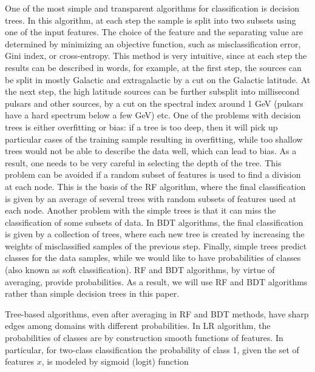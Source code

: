 One of the most simple and transparent algorithms for classification is decision trees.
In this algorithm, at each step the sample is split into two subsets using one of the input features.
The choice of the feature and the separating value are determined by minimizing an objective function, such as misclassification
error, Gini index, or cross-entropy.
This method is very intuitive, since at each step the results can be described in words, 
for example, at the first step, the sources can be split in mostly Galactic and extragalactic by a cut on the Galactic latitude.
At the next step, the high latitude sources can be further subsplit into millisecond pulsars and other sources, by a cut on the spectral index around 1 GeV (pulsars have a hard spectrum below a few GeV) etc.
One of the problems with decision trees is either overfitting or bias: if a tree is too deep, then it will pick up particular cases of the training sample resulting in overfitting, while too shallow trees would not be able to describe the data well, which can lead to bias. 
As a result, one needs to be very careful in selecting the depth of the tree.
This problem can be avoided if a random subset of features is used to find a division at each node. This is the basis of the RF algorithm,
where the final classification is given by an average of several trees with random subsets of features used at each node.
Another problem with the simple trees is that it can miss the classification of some subsets of data. In BDT algorithms, the final classification is given by a collection of trees, where each new tree is created by increasing the weights of misclassified samples of the previous step. 
Finally, simple trees predict classes for the data samples, while we would like to have probabilities of classes (also known as soft classification).
RF and BDT algorithms, by virtue of averaging, provide probabilities. As a result, we will use RF and BDT algorithms rather than simple decision trees in this paper.

Tree-based algorithms, even after averaging in RF and BDT methods, have sharp edges among domains with different probabilities.
In LR algorithm, the probabilities of classes are by construction smooth functions of features.
In particular, for two-class classification the probability of class 1, given the set of features $x$, is modeled by sigmoid (logit) function

